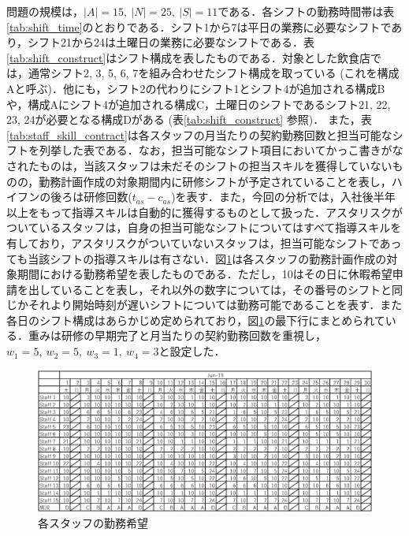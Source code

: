 \documentclass[twocolumn]{jsarticle}
\begin{document}
問題の規模は，$|A| = 15, \ |N| = 25, \ |S| = 11$である．各シフトの勤務時間帯は表\ref{tab:shift_time}のとおりである．シフト1から7は平日の業務に必要なシフトであり，シフト21から24は土曜日の業務に必要なシフトである．表\ref{tab:shift_construct}はシフト構成を表したものである．対象とした飲食店では，通常シフト2, 3, 5, 6, 7を組み合わせたシフト構成を取っている (これを構成Aと呼ぶ)．他にも，シフト2の代わりにシフト1とシフト4が追加される構成Bや，構成Aにシフト4が追加される構成C，土曜日のシフトであるシフト21, 22, 23, 24が必要となる構成Dがある (表\ref{tab:shift_construct} 参照)． また，表\ref{tab:staff_skill_contract}は各スタッフの月当たりの契約勤務回数と担当可能なシフトを列挙した表である．なお，担当可能なシフト項目においてかっこ書きがなされたものは，当該スタッフは未だそのシフトの担当スキルを獲得していないものの，勤務計画作成の対象期間内に研修シフトが予定されていることを表し，ハイフンの後ろは研修回数($t_{as} - c_{as}$)を表す．また，今回の分析では，入社後半年以上をもって指導スキルは自動的に獲得するものとして扱った．アスタリスクがついているスタッフは，自身の担当可能なシフトについてはすべて指導スキルを有しており，アスタリスクがついていないスタッフは，担当可能なシフトであっても当該シフトの指導スキルは有さない．図\ref{fig:shift_preference}は各スタッフの勤務計画作成の対象期間における勤務希望を表したものである．ただし，10はその日に休暇希望申請を出していることを表し，それ以外の数字については，その番号のシフトと同じかそれより開始時刻が遅いシフトについては勤務可能であることを表す．また各日のシフト構成はあらかじめ定められており，図\ref{fig:shift_preference}の最下行にまとめられている．重みは研修の早期完了と月当たりの契約勤務回数を重視し，$w_1 = 5, \ w_2 = 5, \ w_3 = 1, \ w_4 = 3$と設定した．

\begin{figure}
\begin{center}
\includegraphics[width = 13.2cm]{figs/june_preference.eps}
\end{center}
\caption{各スタッフの勤務希望}
\label{fig:shift_preference}
\end{figure}
\end{document}
